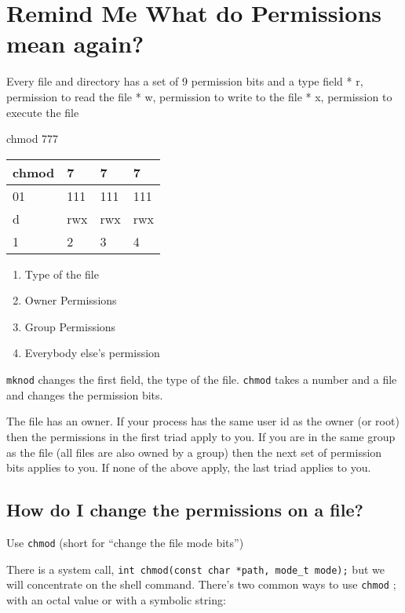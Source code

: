\section{Remind Me What do Permissions mean
again?}\label{remind-me-what-do-permissions-mean-again}

Every file and directory has a set of 9 permission bits and a type field
* r, permission to read the file * w, permission to write to the file *
x, permission to execute the file

chmod 777

\begin{longtable}[c]{@{}llll@{}}
\toprule
chmod & 7 & 7 & 7\tabularnewline
\midrule
\endhead
01 & 111 & 111 & 111\tabularnewline
d & rwx & rwx & rwx\tabularnewline
1 & 2 & 3 & 4\tabularnewline
\bottomrule
\end{longtable}

\begin{enumerate}
\def\labelenumi{\arabic{enumi}.}
\tightlist
\item
  Type of the file
\item
  Owner Permissions
\item
  Group Permissions
\item
  Everybody else's permission
\end{enumerate}

\texttt{mknod} changes the first field, the type of the file.
\texttt{chmod} takes a number and a file and changes the permission
bits.

The file has an owner. If your process has the same user id as the owner
(or root) then the permissions in the first triad apply to you. If you
are in the same group as the file (all files are also owned by a group)
then the next set of permission bits applies to you. If none of the
above apply, the last triad applies to you.

\subsection{How do I change the permissions on a
file?}\label{how-do-i-change-the-permissions-on-a-file}

Use \texttt{chmod} (short for ``change the file mode bits'')

There is a system call,
\texttt{int\ chmod(const\ char\ *path,\ mode\_t\ mode);} but we will
concentrate on the shell command. There's two common ways to use
\texttt{chmod} ; with an octal value or with a symbolic string:

